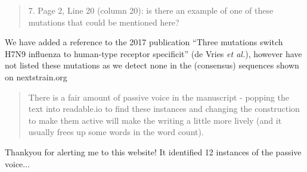 \documentclass[12pt,a4paper]{article}
\begin{document}
\begin{quote}
7. Page 2, Line 20 (column 20): is there an example of one of these mutations that could be mentioned here?
\end{quote}
We have added a reference to the 2017 publication ``Three mutations switch H7N9 influenza to human-type receptor specificit'' (de Vries \textit{et al.}), however have not listed these mutations as we detect none in the (consensus) sequences shown on nextstrain.org

\begin{quote}
There is a fair amount of passive voice in the manuscript - popping the text into readable.io to find these instances and changing the construction to make them active will make the writing a little more lively (and it usually frees up some words in the word count).
\end{quote}
Thankyou for alerting me to this website! It identified 12 instances of the passive voice...
\end{document}
